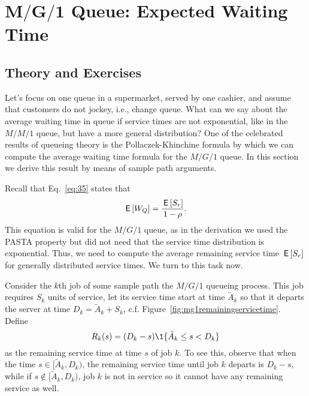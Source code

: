 \section
[$M/G/1$ Queue: Expected Waiting Time]
{$\mathbf{M/G/1}$ Queue: Expected Waiting Time}
\label{sec:mg1}


\subsection*{Theory and Exercises}



Let's focus on one queue in a supermarket, served by one cashier, and
assume that customers do not jockey, i.e., change queue. What can we
say about the average waiting time in queue if service times are not
exponential, like in the $M/M/1$ queue, but have a more general
distribution? One of the celebrated results of queueing theory is the
Pollaczek-Khinchine formula by which we can compute the average
waiting time formula for the $M/G/1$ queue. In this section we derive
this result by means of sample path arguments.

Recall that Eq.~\eqref{eq:35} states that
\begin{equation*}
  \,\mathsf{E}\left[W_Q\right] = \frac{\,\mathsf{E}\left[S_r\right]}{1-\rho}.
\end{equation*}
This equation is valid for the $M/G/1$ queue, as in the derivation we
used the PASTA property but did not need that the
service time distribution is exponential. Thus, we need to compute the average remaining service time $\,\mathsf{E}\left[S_r\right]$ for generally distributed service times. We turn to this task now.

Consider the $k$th job of some sample path the $M/G/1$ queueing
process. This job requires $S_k$ units of service, let its service
time start at time $\tilde A_k$ so that it departs the server at time
$D_k=\tilde A_k + S_k$, c.f. Figure~\ref{fig:mg1remainingservicetime}. Define
\begin{equation*}
R_k(s) = (D_k-s)\1{\tilde A_k \leq s < D_k}
\end{equation*}
as the remaining service time at time $s$ of job $k$. To see this,
observe that when the time $s\in [\tilde A_k, D_k)$, the remaining service
time until job $k$ departs is $D_k-s $, while if
$s\not \in [\tilde A_k, D_k)$, job $k$ is not in service so it cannot have
any remaining service as well.

